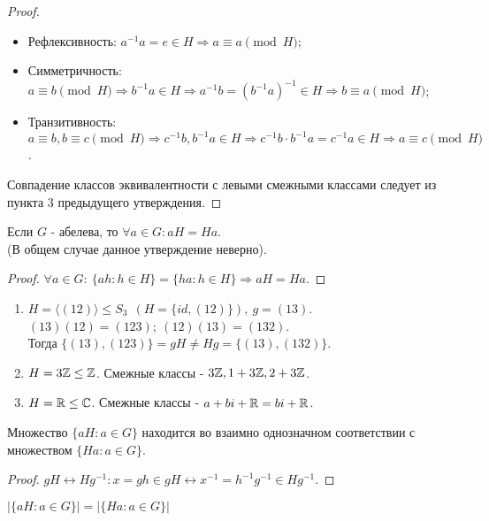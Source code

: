 \begin{proof}\tab
    \begin{itemize}
        \item Рефлексивность: $a^{-1}a = e \in H \Longrightarrow a \equiv a \pmod{H}$;
        \item Симметричность: $a \equiv b \pmod{H} \Rightarrow b^{-1}a \in H \Rightarrow a^{-1}b = (b^{-1}a)^{-1} \in H \Rightarrow b \equiv a \pmod{H}$;
        \item Транзитивность: $a \equiv b, b \equiv c \pmod{H} \Longrightarrow c^{-1}b, b^{-1}a \in H \Longrightarrow c^{-1}b \cdot b^{-1}a = c^{-1}a \in H \Longrightarrow a \equiv c \pmod{H}$. 
    \end{itemize}
    Совпадение классов эквивалентности с левыми смежными классами следует из пункта 3 предыдущего утверждения. 
\end{proof}
\begin{subtheorem}
    Если $G$ - абелева, то $\forall a\in G: aH=Ha$. \\
    (В общем случае данное утверждение неверно).
\end{subtheorem}
\begin{proof}
    $\forall a \in G: \ \{ah: h \in H\} = \{ha: h \in H\} \Longrightarrow aH = Ha$.
\end{proof}
\begin{examples} \tab
    \begin{enumerate}
        \item $H = \langle (12) \rangle \leq S_3 \ \ (H = \{id, (12)\}),\ g=(13)$.\\
        $(13)(12) = (123); \ (12)(13) = (132)$.\\
        Тогда $\{(13), (123)\}=gH\not=Hg=\{(13), (132)\}$.
        \item $H = 3\mathbb{Z} \leq \mathbb{Z}$.
        Смежные классы - $3\mathbb{Z}, 1 + 3\mathbb{Z}, 2 + 3\mathbb{Z}$.
        \item $H = \mathbb{R} \leq \mathbb{C}$.
        Смежные классы - $a+bi+\mathbb{R}=bi+\mathbb{R}$.
    \end{enumerate}
\end{examples}
\begin{subtheorem}
    Множество $\{aH : a\in G\}$ находится во взаимно однозначном соответствии с множеством $\{Ha: a\in G\}$.
\end{subtheorem}
\begin{proof}
    $gH \leftrightarrow Hg^{-1}: x=gh\in gH \leftrightarrow x^{-1}=h^{-1}g^{-1}\in Hg^{-1}$.
\end{proof}
\begin{consequense}
    $|\{aH: a\in G\}|=|\{Ha: a\in G\}|$
\end{consequense}
